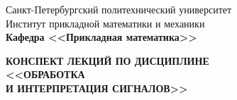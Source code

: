 \documentclass[main.tex]{subfiles}
\begin{document}
\begin{titlepage}
\begin{center}
	\begin{large}
		Санкт-Петербургский политехнический университет\\
		Институт прикладной математики и механики\\
		\textbf{Кафедра <<Прикладная математика>>}\\
	\end{large}
	\vfill
	\Large{\textbf{КОНСПЕКТ ЛЕКЦИЙ ПО ДИСЦИПЛИНЕ \\
			 <<ОБРАБОТКА \\
			 И ИНТЕРПРЕТАЦИЯ СИГНАЛОВ>>}}
\end{center}
\vfill
\begin{figure}[H]
\end{figure}
\vfill
{}
\end{titlepage}
\end{document}
